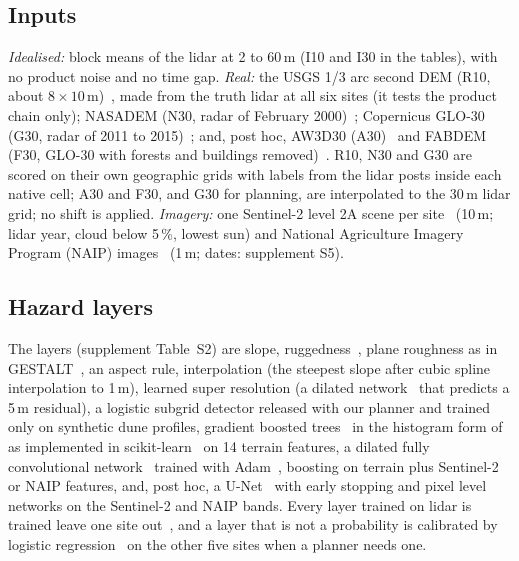 \documentclass[conference]{IEEEtran}
\begin{document}
\subsection{Inputs}
\textit{Idealised:} block means of the lidar at 2 to 60\,m (I10 and I30 in the tables), with no product noise and no time gap. \textit{Real:} the USGS 1/3 arc second DEM (R10, about $8\times10$\,m)~\cite{usgs3dep13}, made from the truth lidar at all six sites (it tests the product chain only); NASADEM (N30, radar of February 2000)~\cite{nasadem}; Copernicus GLO-30 (G30, radar of 2011 to 2015)~\cite{copernicusdem}; and, post hoc, AW3D30 (A30)~\cite{tadono2014aw3d} and FABDEM (F30, GLO-30 with forests and buildings removed)~\cite{hawker2022fabdem}. R10, N30 and G30 are scored on their own geographic grids with labels from the lidar posts inside each native cell; A30 and F30, and G30 for planning, are interpolated to the 30\,m lidar grid; no shift is applied. \textit{Imagery:} one Sentinel-2 level 2A scene per site~\cite{drusch2012sentinel} (10\,m; lidar year, cloud below 5\,\%, lowest sun) and National Agriculture Imagery Program (NAIP) images~\cite{naip} (1\,m; dates: supplement S5).

\subsection{Hazard layers}
The layers (supplement Table~S2) are slope, ruggedness~\cite{riley1999}, plane roughness as in GESTALT~\cite{goldberg2002}, an aspect rule, interpolation (the steepest slope after cubic spline interpolation to 1\,m), learned super resolution (a dilated network~\cite{yu2016} that predicts a 5\,m residual), a logistic subgrid detector released with our planner and trained only on synthetic dune profiles, gradient boosted trees~\cite{friedman2001} in the histogram form of~\cite{ke2017} as implemented in scikit-learn~\cite{pedregosa2011} on 14 terrain features, a dilated fully convolutional network~\cite{long2015fully} trained with Adam~\cite{kingma2015adam}, boosting on terrain plus Sentinel-2 or NAIP features, and, post hoc, a U-Net~\cite{ronneberger2015unet} with early stopping and pixel level networks on the Sentinel-2 and NAIP bands. Every layer trained on lidar is trained leave one site out~\cite{roberts2017}, and a layer that is not a probability is calibrated by logistic regression~\cite{platt1999} on the other five sites when a planner needs one.
\end{document}
